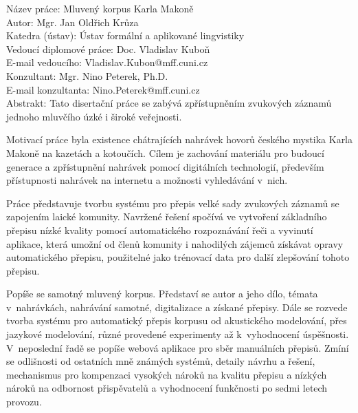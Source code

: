 \noindent Název práce: Mluven\'{y} korpus Karla Makon\v{e}\\
Autor: Mgr. Jan Oldřich Krůza\\
Katedra (ústav): Ústav formální a aplikované lingvistiky\\
Vedoucí diplomové práce: Doc. Vladislav Kuboň\\
E-mail vedoucího: Vladislav.Kubon@mff.cuni.cz\\
Konzultant: Mgr. Nino Peterek, Ph.D.\\
E-mail konzultanta: Nino.Peterek@mff.cuni.cz\\

\noindent Abstrakt: Tato disertační práce se zabývá zpřístupněním zvukových
záznamů jednoho mluvčího úzké i široké veřejnosti.

Motivací práce byla existence chátrajících nahrávek hovorů českého mystika
Karla Makoně na kazetách a kotoučích. Cílem je zachování materiálu pro
budoucí generace a zpřístupnění nahrávek pomocí digitálních technologií,
především přístupnosti nahrávek na internetu a možnosti vyhledávání v~nich.

Práce představuje tvorbu systému pro přepis velké sady zvukových záznamů
se zapojením laické komunity. Navržené řešení spočívá ve vytvoření základního
přepisu nízké kvality pomocí automatického rozpoznávání řeči a vyvinutí
aplikace, která umožní od členů komunity i nahodilých zájemců získávat opravy
automatického přepisu, použitelné jako trénovací data pro další zlepšování
tohoto přepisu.

Popíše se samotný mluvený korpus. Představí se autor a
jeho dílo,
témata v~nahrávkách, nahrávání samotné, digitalizace a získané přepisy.
Dále se rozvede tvorba systému pro automatický
přepis korpusu od akustického modelování, přes jazykové modelování, různé
provedené experimenty až k~vyhodnocení úspěšnosti. V~neposlední řadě se popíše
webová aplikace pro sběr manuálních přepisů. Zmíní se odlišnosti od ostatních mně známých
systémů, detaily návrhu a řešení, mechanismus pro kompenzaci vysokých nároků na kvalitu
přepisu a nízkých nároků na odbornost přispěvatelů a vyhodnocení funkčnosti
po sedmi letech provozu.


\vspace{10mm}

